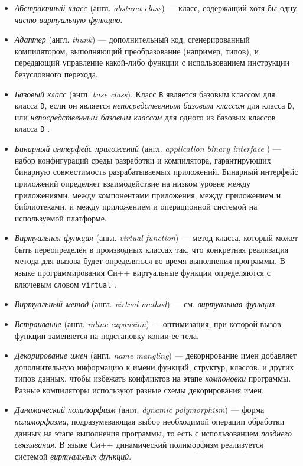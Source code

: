 \begin{itemize}
\item {\it Абстрактный класс} (англ. {\it abstract class}) --- класс, содержащий хотя бы одну {\it чисто виртуальную функцию}.
\item {\it Адаптер} (англ. {\it thunk}) --- дополнительный код, сгенерированный компилятором, выполняющий преобразование (например, типов), и передающий управление какой-либо функции с использованием инструкции безусловного перехода.
\item {\it Базовый класс} (англ. {\it base class}). Класс \lstinline{B} является базовым классом для класса \lstinline{D}, если он является {\it непосредственным базовым классом} для класса \lstinline{D}, или {\it непосредственным базовым классом} для одного из базовых классов класса \lstinline{D} \cite{cpp03}. %
\item {\it Бинарный интерфейс приложений} (англ. {\it application binary interface} ) --- набор конфигураций среды разработки и компилятора, гарантирующих бинарную совместимость разрабатываемых приложений. Бинарный интерфейс приложений определяет взаимодействие на низком уровне между приложениями, между компонентами приложения, между приложением и библиотеками, и между приложением и операционной системой на используемой платформе.
\item {\it Виртуальная функция} (англ. {\it virtual function}) --- метод класса, который может быть переопределён в производных классах так, что конкретная реализация метода для вызова будет определяться во время выполнения программы. В языке программирования Си++ виртуальные функции определяются с ключевым словом \lstinline{virtual} \cite{stroustrup97ru}.
\item {\it Виртуальный метод} (англ. {\it virtual method}) --- см. {\it виртуальная функция}.
\item {\it Встраивание} (англ. {\it inline expansion}) --- оптимизация, при которой вызов функции заменяется на подстановку копии ее тела.
\item {\it Декорирование имен} (англ. {\it name mangling}) --- декорирование имен добавляет дополнительную информацию к имени функций, структур, классов, и других типов данных, чтобы избежать конфликтов на этапе {\it компоновки} программы. Разные компиляторы используют разные схемы декорирования имен.
\item {\it Динамический полиморфизм} (англ. {\it dynamic polymorphism}) --- форма {\it полиморфизма}, подразумевающая выбор необходимой операции обработки данных на этапе выполнения программы, то есть с использованием {\it позднего связывания}. В языке Си++ динамический полиморфизм реализуется системой {\it виртуальных функций}.

\end{itemize}

